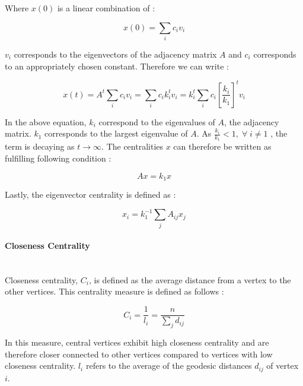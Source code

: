 	\noindent Where $x(0)$ is a linear combination of \citep[p. 170]{Newman2010}:

	\begin{equation}
		x(0) =  \sum_{i}c_{i}v_{i}
	\end{equation}

	\noindent $v_i$ corresponds to the eigenvectors of the adjacency matrix $A$
	and $c_i$ corresponds to an appropriately chosen constant. Therefore we can
	write \citep[p. 170]{Newman2010}:

	\begin{equation}
		x(t) =  A^t \sum_{i}c_{i}v_{i} = \sum_{i} c_i k_i^t v_i = 
		k_i^t \sum_{i} c_i \left[\frac{k_i}{k_1}\right]^t v_i
	\end{equation}

	\noindent In the above equation, $k_i$ correspond to the eigenvalues of $A$, 
	the adjacency matrix. $k_1$ corresponds to the largest eigenvalue of $A$.
	As $\frac{k_i}{k_1} < 1, \; \forall \; i\neq 1$ , the term is decaying as 
	$t \rightarrow \infty$. The centralities $x$ can therefore be written
	as fulfilling following condition \citep[p. 170]{Newman2010}:

	\begin{equation}
		Ax = k_1 x	
	\end{equation}

	\noindent Lastly, the eigenvector centrality is defined as \citep[p. 170]{Newman2010}:

	\begin{equation}
		x_i = k_{1}^{-1} \sum_{j} A_{ij}x_j 
	\end{equation}

	\paragraph{Closeness Centrality} \mbox{}\\

	\noindent Closeness centrality, $C_i$, is defined as the average distance 
	from a vertex to the other vertices. This centrality measure is defined as 
	follows \citep[p. 182]{Newman2010}:

	\begin{equation}
		C_i = \frac{1}{l_i} = \frac{n}{\sum_{j}d_{ij}}
	\end{equation}

	\noindent In this measure, central vertices exhibit high closeness 
	centrality and are therefore closer connected to other vertices compared to 
	vertices with low closeness centrality. $l_i$ refers to the average of the 
	geodesic distances $d_{ij}$ of vertex $i$.

